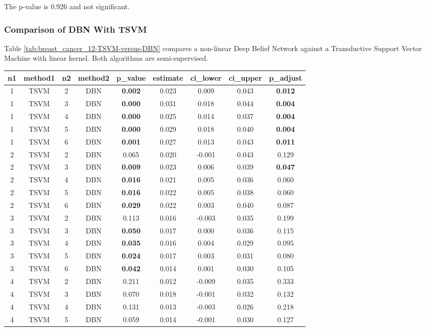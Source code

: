 The p-value is 0.926 and not significant.

\subsubsection{Comparison of DBN With TSVM}

Table \ref{tab:breast_cancer_12-TSVM-versus-DBN} compares a non-linear
Deep Belief Network against a Transductive Support Vector Machine
with linear kernel. Both algorithms are semi-supervised.

\begin{table}[p]
\begin{centering}
\begin{tabular}{|c|c|c|c|c|c|c|c|c|}
\hline 
n1 & method1 & n2 & method2 & p\_value & estimate & ci\_lower & ci\_upper & p\_adjust\tabularnewline
\hline 
\hline 
1 & TSVM & 2 & DBN & \textbf{0.002} & 0.023 & 0.009 & 0.043 & \textbf{0.012}\tabularnewline
\hline 
1 & TSVM & 3 & DBN & \textbf{0.000} & 0.031 & 0.018 & 0.044 & \textbf{0.004}\tabularnewline
\hline 
1 & TSVM & 4 & DBN & \textbf{0.000} & 0.025 & 0.014 & 0.037 & \textbf{0.004}\tabularnewline
\hline 
1 & TSVM & 5 & DBN & \textbf{0.000} & 0.029 & 0.018 & 0.040 & \textbf{0.004}\tabularnewline
\hline 
1 & TSVM & 6 & DBN & \textbf{0.001} & 0.027 & 0.013 & 0.043 & \textbf{0.011}\tabularnewline
\hline 
2 & TSVM & 2 & DBN & 0.065 & 0.020 & -0.001 & 0.043 & 0.129\tabularnewline
\hline 
2 & TSVM & 3 & DBN & \textbf{0.009} & 0.023 & 0.006 & 0.039 & \textbf{0.047}\tabularnewline
\hline 
2 & TSVM & 4 & DBN & \textbf{0.016} & 0.021 & 0.005 & 0.036 & 0.060\tabularnewline
\hline 
2 & TSVM & 5 & DBN & \textbf{0.016} & 0.022 & 0.005 & 0.038 & 0.060\tabularnewline
\hline 
2 & TSVM & 6 & DBN & \textbf{0.029} & 0.022 & 0.003 & 0.040 & 0.087\tabularnewline
\hline 
3 & TSVM & 2 & DBN & 0.113 & 0.016 & -0.003 & 0.035 & 0.199\tabularnewline
\hline 
3 & TSVM & 3 & DBN & \textbf{0.050} & 0.017 & 0.000 & 0.036 & 0.115\tabularnewline
\hline 
3 & TSVM & 4 & DBN & \textbf{0.035} & 0.016 & 0.004 & 0.029 & 0.095\tabularnewline
\hline 
3 & TSVM & 5 & DBN & \textbf{0.024} & 0.017 & 0.003 & 0.031 & 0.080\tabularnewline
\hline 
3 & TSVM & 6 & DBN & \textbf{0.042} & 0.014 & 0.001 & 0.030 & 0.105\tabularnewline
\hline 
4 & TSVM & 2 & DBN & 0.211 & 0.012 & -0.009 & 0.035 & 0.333\tabularnewline
\hline 
4 & TSVM & 3 & DBN & 0.070 & 0.018 & -0.001 & 0.032 & 0.132\tabularnewline
\hline 
4 & TSVM & 4 & DBN & 0.131 & 0.013 & -0.003 & 0.026 & 0.218\tabularnewline
\hline 
4 & TSVM & 5 & DBN & 0.059 & 0.014 & -0.001 & 0.030 & 0.127\tabularnewline

\end{tabular}
\end{centering}
\end{table}
